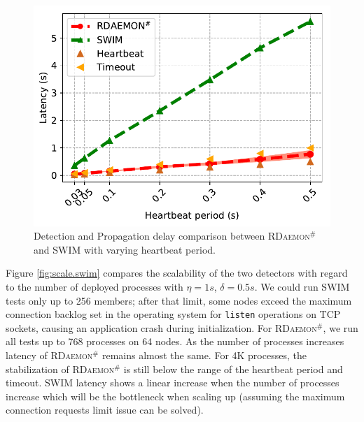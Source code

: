 \documentclass[5p,times,twocolumn]{elsarticle}
\newcommand{\ourwork}[0]{\textsc{RDaemon}\ensuremath{^\#}\xspace}
\begin{document}
\begin{figure}[h]
  \centering
  \includegraphics[width=\linewidth]{HB_prrte_swim.pdf}\vspace{-1em}
  \caption{Detection and Propagation delay comparison between \ourwork and SWIM with varying heartbeat period.}
  \label{fig:hb.prrte.swim}
\end{figure}

Figure \ref{fig:scale.swim} compares the scalability of the two detectors with regard to the number of deployed processes with $\eta = 1s$, $\delta = 0.5s$.
We could run SWIM tests only up to 256 members; after that limit, some nodes exceed the maximum connection backlog
set in the operating system for \texttt{listen} operations on TCP sockets, causing an application crash during
initialization. For \ourwork,
we run all tests up to 768 processes on 64 nodes.
%
As the number of processes increases latency of \ourwork remains almost the same.
For 4K processes, the stabilization of \ourwork is still below the range of the heartbeat period and timeout.
SWIM latency shows a linear increase when the number of processes increase which will be the bottleneck when scaling up (assuming the maximum connection requests limit issue can be solved).
\end{document}

